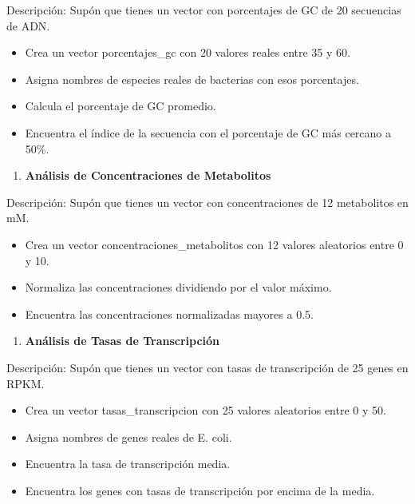\documentclass[
]{book}
\providecommand{\tightlist}{%
  \setlength{\itemsep}{0pt}\setlength{\parskip}{0pt}}
\begin{document}
Descripción: Supón que tienes un vector con porcentajes de GC de 20 secuencias de ADN.

\begin{itemize}
\tightlist
\item
  Crea un vector porcentajes\_gc con 20 valores reales entre 35 y 60.
\item
  Asigna nombres de especies reales de bacterias con esos porcentajes.
\item
  Calcula el porcentaje de GC promedio.
\item
  Encuentra el índice de la secuencia con el porcentaje de GC más cercano a 50\%.
\end{itemize}

\begin{enumerate}
\def\labelenumi{\arabic{enumi}.}
\setcounter{enumi}{7}
\tightlist
\item
  \textbf{Análisis de Concentraciones de Metabolitos}
\end{enumerate}

Descripción: Supón que tienes un vector con concentraciones de 12 metabolitos en mM.

\begin{itemize}
\tightlist
\item
  Crea un vector concentraciones\_metabolitos con 12 valores aleatorios entre 0 y 10.
\item
  Normaliza las concentraciones dividiendo por el valor máximo.
\item
  Encuentra las concentraciones normalizadas mayores a 0.5.
\end{itemize}

\begin{enumerate}
\def\labelenumi{\arabic{enumi}.}
\setcounter{enumi}{8}
\tightlist
\item
  \textbf{Análisis de Tasas de Transcripción}
\end{enumerate}

Descripción: Supón que tienes un vector con tasas de transcripción de 25 genes en RPKM.

\begin{itemize}
\tightlist
\item
  Crea un vector tasas\_transcripcion con 25 valores aleatorios entre 0 y 50.
\item
  Asigna nombres de genes reales de E. coli.
\item
  Encuentra la tasa de transcripción media.
\item
  Encuentra los genes con tasas de transcripción por encima de la media.
\end{itemize}
\end{document}
